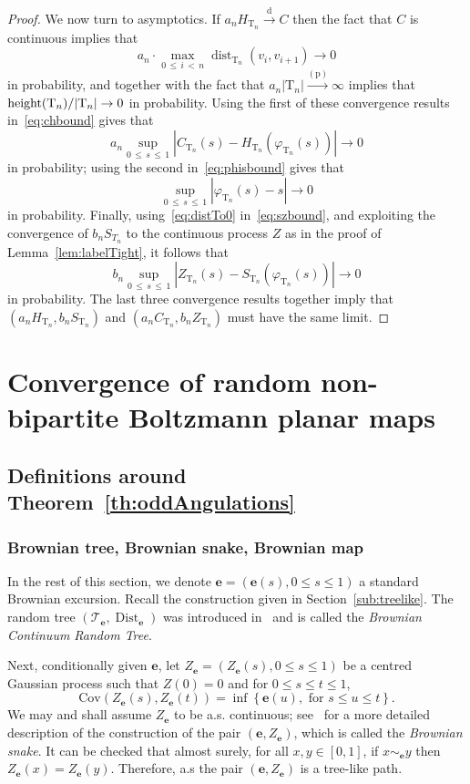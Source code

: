 \documentclass[10pt]{amsart}
\theoremstyle{definition}\newtheorem{defi}[theo]{Definition}\newtheorem{rema}[theo]{Remark}\newtheorem{exam}[theo]{Example}\newtheorem{exem}[theo]{Example}\newtheorem{nota}[theo]{Notation}
\newcommand{\bfe}{\mathbf{e}}
\newcommand{\be}{\mathbf{e}}
\newcommand{\cT}{\mathcal{T}}
\newcommand{\rT}{\mathrm{T}}
\DeclareMathOperator{\dist}{dist}
\DeclareMathOperator{\Dist}{Dist}
\DeclareMathOperator{\height}{height}
\newcommand{\convdist}{\ensuremath{\stackrel{\mathrm{d}}{\rightarrow}}}
\newcommand{\convpr}{\ensuremath{\stackrel{\mathrm{(p)}}{\longrightarrow}}}
\begin{document}
\begin{proof}
We now turn to asymptotics. If $a_nH_{\rT_n} \convdist C$ then the fact that $C$ is continuous implies that
\begin{equation}\label{eq:distTo0}
a_n \cdot \max_{0\,\le\,i\,<\,n} \dist_{\rT_n}(v_i,v_{i+1}) \to 0
\end{equation}
in probability, and together with the fact that $a_n|\rT_n| \convpr \infty$ implies that $\height(\rT_n)\linebreak /|\rT_n| \to 0$ in probability. Using the first of these convergence results in~\eqref{eq:chbound} gives that
\[
a_n\sup_{0\,\le\,s\,\le\,1} \left|C_{\rT_n}(s)-H_{\rT_n}(\varphi_{\rT_n}(s))\right| \to 0
\]
in probability; using the second in~\eqref{eq:phisbound} gives that
\[
\sup_{0\,\le\,s\,\le\,1} \left| \varphi_{\rT_n}(s)-s\right| \to 0
\]
in probability. Finally, using~\eqref{eq:distTo0} in~\eqref{eq:szbound}, and exploiting the convergence of $b_nS_{T_n}$ to the continuous process $Z$ as in the proof of Lemma~\ref{lem:labelTight}, it follows that
\[
b_n\sup_{0\,\le\,s\,\le\,1} \left|Z_{\rT_n}(s)-S_{\rT_n}(\varphi_{\rT_n}(s))\right| \to 0
\]
in probability. The last three convergence results together imply that $(a_nH_{\rT_n},b_nS_{\rT_n})$ and $(a_nC_{\rT_n},b_nZ_{\rT_n})$ must have the same limit.
\end{proof}



\section{Convergence of random non-bipartite Boltzmann planar maps}\label{sec:planarMaps}


\subsection{Definitions around Theorem~\ref{th:oddAngulations}}


\subsubsection{Brownian tree, Brownian snake, Brownian map}\label{sub:brownian}
In the rest of this section, we denote $\bfe=(\bfe(s), 0\leq s\leq 1)$ a standard Brownian excursion. Recall the construction given in Section~\ref{sub:treelike}. The random tree $(\cT_{\bfe},\Dist_{\bfe})$ was introduced in~\cite{AldousCRT2} and is called the \emph{Brownian Continuum Random Tree}.

Next, conditionally given $\bfe$, let $Z_{\be}=(Z_{\be}(s), 0\leq s \leq 1)$ be a centred Gaussian process such that $Z(0)=0$ and for $0\leq s \leq t \leq 1$,
\[
\text{Cov}\left(Z_{\be}(s),Z_{\be}(t)\right) = \inf \left\{\bfe(u), \text{ for } s\leq u\leq t\right\}.
\]
We may and shall assume $Z_{\be}$ to be a.s. continuous; see~\cite[Section~3]{LeGallSurvey} for a more detailed description of the construction of the pair $(\bfe,Z_{\be})$, which is called the \emph{Brownian snake}. It can be checked that almost surely, for all $x,y \in [0,1]$, if $x\sim_{\bfe}y$ then $Z_{\be}(x)=Z_{\be}(y)$. Therefore, a.s the pair $(\bfe,Z_{\be})$ is a tree-like path.
\end{document}
